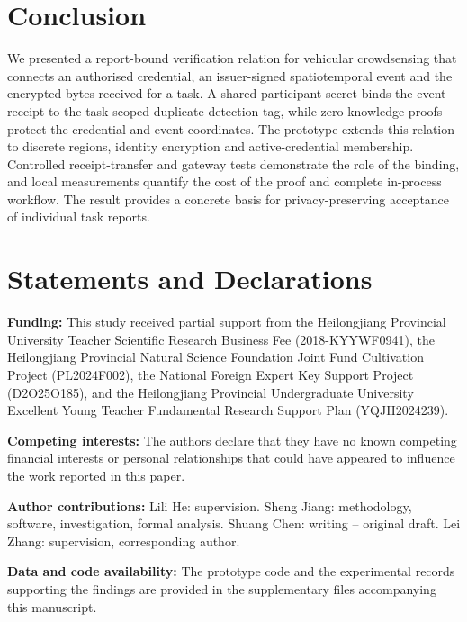 \documentclass[pdflatex,iicol,sn-mathphys-num]{sn-jnl}
\begin{document}
\section{Conclusion}
We presented a report-bound verification relation for vehicular crowdsensing that connects an authorised credential, an issuer-signed spatiotemporal event and the encrypted bytes received for a task. A shared participant secret binds the event receipt to the task-scoped duplicate-detection tag, while zero-knowledge proofs protect the credential and event coordinates. The prototype extends this relation to discrete regions, identity encryption and active-credential membership. Controlled receipt-transfer and gateway tests demonstrate the role of the binding, and local measurements quantify the cost of the proof and complete in-process workflow. The result provides a concrete basis for privacy-preserving acceptance of individual task reports.



\section*{Statements and Declarations}
\noindent\textbf{Funding:} This study received partial support from the Heilongjiang Provincial University Teacher Scientific Research Business Fee (2018-KYYWF0941), the Heilongjiang Provincial Natural Science Foundation Joint Fund Cultivation Project (PL2024F002), the National Foreign Expert Key Support Project (D2O25O185), and the Heilongjiang Provincial Undergraduate University Excellent Young Teacher Fundamental Research Support Plan (YQJH2024239).

\noindent\textbf{Competing interests:} The authors declare that they have no known competing financial interests or personal relationships that could have appeared to influence the work reported in this paper.

\noindent\textbf{Author contributions:} Lili He: supervision. Sheng Jiang: methodology, software, investigation, formal analysis. Shuang Chen: writing -- original draft. Lei Zhang: supervision, corresponding author.

\noindent\textbf{Data and code availability:} The prototype code and the experimental records supporting the findings are provided in the supplementary files accompanying this manuscript.
\end{document}
